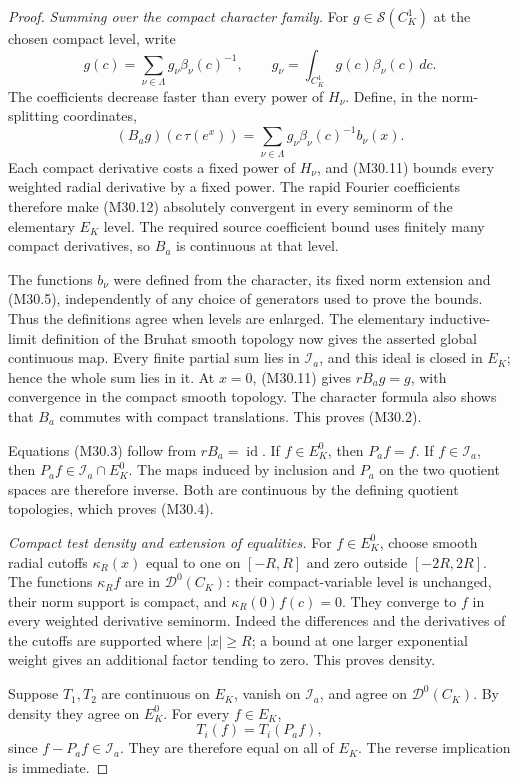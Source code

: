 \begin{proof}
\emph{Summing over the compact character family.}
For \(g\in\mathcal S(C_K^1)\) at the
chosen compact level, write
\[
       g(c)=\sum_{\nu\in\Lambda}g_\nu\beta_\nu(c)^{-1},
       \qquad
       g_\nu=\int_{C_K^1}g(c)\beta_\nu(c)\,dc .
 \]
The coefficients decrease faster
than every power of \(H_\nu\).
Define, in the norm-splitting coordinates,
\[
 (B_ag)(c\,\tau(e^x))
       =\sum_{\nu\in\Lambda}
                   g_\nu\beta_\nu(c)^{-1}b_\nu(x).
                                                               \tag{M30.12}
\]
Each compact derivative costs a
fixed power of \(H_\nu\), and
(M30.11) bounds every weighted
radial derivative by a fixed power.
The rapid Fourier coefficients
therefore make (M30.12) absolutely
convergent in every seminorm of
the elementary \(E_K\) level.
The required source coefficient
bound uses finitely many compact
derivatives, so \(B_a\) is
continuous at that level.

The functions \(b_\nu\) were
defined from the character,
its fixed norm extension and
(M30.5), independently of any
choice of generators used to
prove the bounds. Thus the
definitions agree when levels
are enlarged. The elementary
inductive-limit definition of
the Bruhat smooth topology
now gives the asserted global
continuous map.
Every finite partial sum lies
in \(\mathcal I_a\), and this
ideal is closed in \(E_K\);
hence the whole sum lies in it.
At \(x=0\), (M30.11) gives
\(rB_ag=g\), with convergence
in the compact smooth topology.
The character formula also
shows that \(B_a\) commutes
with compact translations.
This proves (M30.2).

Equations (M30.3) follow from
\(rB_a=\operatorname{id}\).
If \(f\in E_K^0\), then \(P_af=f\).
If \(f\in\mathcal I_a\), then
\(P_af\in\mathcal I_a\cap E_K^0\).
The maps induced by inclusion
and \(P_a\) on the two quotient
spaces are therefore inverse.
Both are continuous by the
defining quotient topologies,
which proves (M30.4).

\emph{Compact test density and extension of equalities.}
For \(f\in E_K^0\), choose smooth
radial cutoffs \(\kappa_R(x)\)
equal to one on \([-R,R]\)
and zero outside \([-2R,2R]\).
The functions \(\kappa_R f\)
are in \(\mathcal D^0(C_K)\):
their compact-variable level
is unchanged, their norm
support is compact, and
\(\kappa_R(0)f(c)=0\).
They converge to \(f\) in
every weighted derivative
seminorm. Indeed the
differences and the derivatives
of the cutoffs are supported
where \(|x|\ge R\); a bound
at one larger exponential
weight gives an additional
factor tending to zero.
This proves density.

Suppose \(T_1,T_2\) are
continuous on \(E_K\), vanish
on \(\mathcal I_a\), and
agree on \(\mathcal D^0(C_K)\).
By density they agree on
\(E_K^0\). For every \(f\in E_K\),
\[
            T_i(f)=T_i(P_af),
 \]
since \(f-P_af\in\mathcal I_a\).
They are therefore equal
on all of \(E_K\). The
reverse implication is immediate.
\end{proof}

